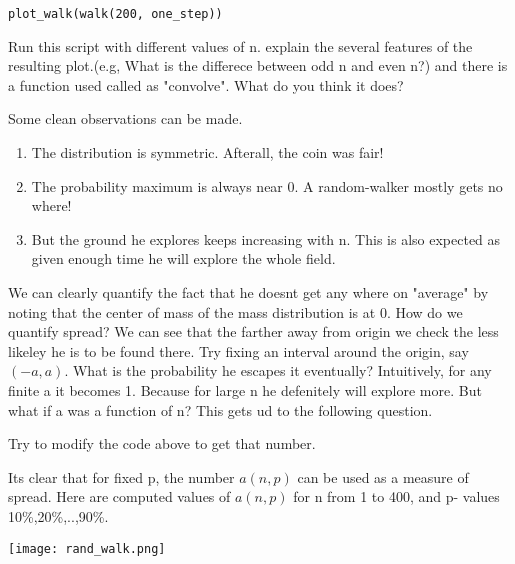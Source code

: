 \documentclass{myclass}
\begin{document}
\begin{example}
\begin{lstlisting}
plot_walk(walk(200, one_step))
\end{lstlisting}
\begin{exe}
    Run this script with different values of n. explain the several features of the resulting plot.(e.g, What is the differece between odd n and even n?)
    and there is a function used called as "convolve". What do you think it does?
\end{exe}
Some clean observations can be made.
\begin{enumerate}
    \item The distribution is symmetric. Afterall, the coin was fair!
    \item The probability maximum is always near 0. A random-walker mostly gets no where!
    \item But the ground he explores keeps increasing with n. This is also expected as given enough time he will explore the whole field.
\end{enumerate}
We can clearly quantify the fact that he doesnt get any where on "average" by noting that the center of mass of the mass distribution is at 0. How do we quantify spread?
We can see that the farther away from origin we check the less likeley he is to be found there. Try fixing an interval around the origin, say $(-a,a)$. What is the probability he escapes it eventually?
Intuitively, for any finite a it becomes 1. Because for large n he defenitely will explore more. But what if a was a function of n? This gets ud to the following question.
\begin{center}
\end{center}
\begin{exe}
    Try to modify the code above to get that number.
\end{exe}
Its clear that for fixed p, the number $a(n,p)$ can be used as a measure of spread. Here are computed values of $a(n,p)$ for n from 1 to 400,
and p- values 10\%,20\%,..,90\%.
\begin{center}
    \texttt{[image: rand\_walk.png]}
\end{center}


\end{example}
\end{document}
